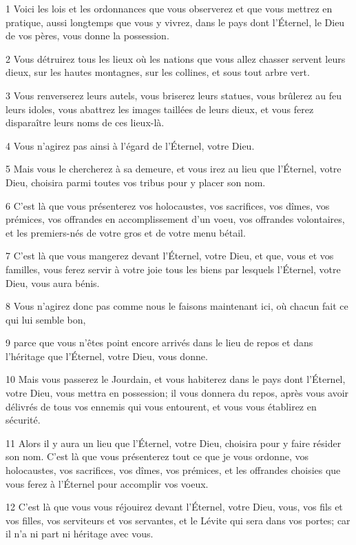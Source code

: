 \par 1 Voici les lois et les ordonnances que vous observerez et que vous mettrez en pratique, aussi longtemps que vous y vivrez, dans le pays dont l'Éternel, le Dieu de vos pères, vous donne la possession.
\par 2 Vous détruirez tous les lieux où les nations que vous allez chasser servent leurs dieux, sur les hautes montagnes, sur les collines, et sous tout arbre vert.
\par 3 Vous renverserez leurs autels, vous briserez leurs statues, vous brûlerez au feu leurs idoles, vous abattrez les images taillées de leurs dieux, et vous ferez disparaître leurs noms de ces lieux-là.
\par 4 Vous n'agirez pas ainsi à l'égard de l'Éternel, votre Dieu.
\par 5 Mais vous le chercherez à sa demeure, et vous irez au lieu que l'Éternel, votre Dieu, choisira parmi toutes vos tribus pour y placer son nom.
\par 6 C'est là que vous présenterez vos holocaustes, vos sacrifices, vos dîmes, vos prémices, vos offrandes en accomplissement d'un voeu, vos offrandes volontaires, et les premiers-nés de votre gros et de votre menu bétail.
\par 7 C'est là que vous mangerez devant l'Éternel, votre Dieu, et que, vous et vos familles, vous ferez servir à votre joie tous les biens par lesquels l'Éternel, votre Dieu, vous aura bénis.
\par 8 Vous n'agirez donc pas comme nous le faisons maintenant ici, où chacun fait ce qui lui semble bon,
\par 9 parce que vous n'êtes point encore arrivés dans le lieu de repos et dans l'héritage que l'Éternel, votre Dieu, vous donne.
\par 10 Mais vous passerez le Jourdain, et vous habiterez dans le pays dont l'Éternel, votre Dieu, vous mettra en possession; il vous donnera du repos, après vous avoir délivrés de tous vos ennemis qui vous entourent, et vous vous établirez en sécurité.
\par 11 Alors il y aura un lieu que l'Éternel, votre Dieu, choisira pour y faire résider son nom. C'est là que vous présenterez tout ce que je vous ordonne, vos holocaustes, vos sacrifices, vos dîmes, vos prémices, et les offrandes choisies que vous ferez à l'Éternel pour accomplir vos voeux.
\par 12 C'est là que vous vous réjouirez devant l'Éternel, votre Dieu, vous, vos fils et vos filles, vos serviteurs et vos servantes, et le Lévite qui sera dans vos portes; car il n'a ni part ni héritage avec vous.
